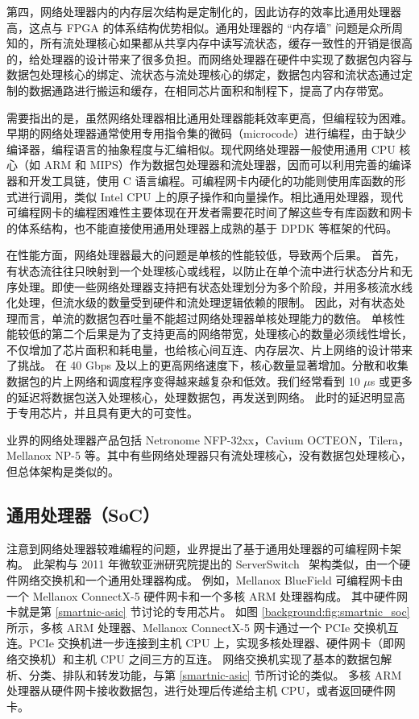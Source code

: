 第四，网络处理器内的内存层次结构是定制化的，因此访存的效率比通用处理器高，这点与 FPGA 的体系结构优势相似。通用处理器的 ``内存墙'' 问题是众所周知的，所有流处理核心如果都从共享内存中读写流状态，缓存一致性的开销是很高的，给处理器的设计带来了很多负担。而网络处理器在硬件中实现了数据包内容与数据包处理核心的绑定、流状态与流处理核心的绑定，数据包内容和流状态通过定制的数据通路进行搬运和缓存，在相同芯片面积和制程下，提高了内存带宽。

需要指出的是，虽然网络处理器相比通用处理器能耗效率更高，但编程较为困难。早期的网络处理器通常使用专用指令集的微码（microcode）进行编程，由于缺少编译器，编程语言的抽象程度与汇编相似。现代网络处理器一般使用通用 CPU 核心（如 ARM 和 MIPS）作为数据包处理器和流处理器，因而可以利用完善的编译器和开发工具链，使用 C 语言编程。可编程网卡内硬化的功能则使用库函数的形式进行调用，类似 Intel CPU 上的原子操作和向量操作。相比通用处理器，现代可编程网卡的编程困难性主要体现在开发者需要花时间了解这些专有库函数和网卡的体系结构，也不能直接使用通用处理器上成熟的基于 DPDK 等框架的代码。

在性能方面，网络处理器最大的问题是单核的性能较低，导致两个后果。
首先，有状态流往往只映射到一个处理核心或线程，以防止在单个流中进行状态分片和无序处理。即使一些网络处理器支持把有状态处理划分为多个阶段，并用多核流水线化处理，但流水级的数量受到硬件和流处理逻辑依赖的限制。
因此，对有状态处理而言，单流的数据包吞吐量不能超过网络处理器单核处理能力的数倍。
单核性能较低的第二个后果是为了支持更高的网络带宽，处理核心的数量必须线性增长，不仅增加了芯片面积和耗电量，也给核心间互连、内存层次、片上网络的设计带来了挑战。
在 40 Gbps 及以上的更高网络速度下，核心数量显著增加。分散和收集数据包的片上网络和调度程序变得越来越复杂和低效。我们经常看到 10 $\mu$s 或更多的延迟将数据包送入处理核心，处理数据包，再发送到网络。
此时的延迟明显高于专用芯片，并且具有更大的可变性。


业界的网络处理器产品包括 Netronome NFP-32xx，Cavium OCTEON，Tilera，Mellanox NP-5 等。其中有些网络处理器只有流处理核心，没有数据包处理核心，但总体架构是类似的。




\subsection{通用处理器（SoC）}
\label{smartnic-soc}

注意到网络处理器较难编程的问题，业界提出了基于通用处理器的可编程网卡架构。
此架构与 2011 年微软亚洲研究院提出的 ServerSwitch~\cite{lu2011serverswitch} 架构类似，由一个硬件网络交换机和一个通用处理器构成。
例如，Mellanox BlueField 可编程网卡由一个 Mellanox ConnectX-5 硬件网卡和一个多核 ARM 处理器构成。
其中硬件网卡就是第 \ref{smartnic-asic} 节讨论的专用芯片。
如图 \ref{background:fig:smartnic_soc} 所示，多核 ARM 处理器、Mellanox ConnectX-5 网卡通过一个 PCIe 交换机互连。PCIe 交换机进一步连接到主机 CPU 上，实现多核处理器、硬件网卡（即网络交换机）和主机 CPU 之间三方的互连。
网络交换机实现了基本的数据包解析、分类、排队和转发功能，与第 \ref{smartnic-asic} 节所讨论的类似。
多核 ARM 处理器从硬件网卡接收数据包，进行处理后传递给主机 CPU，或者返回硬件网卡。


